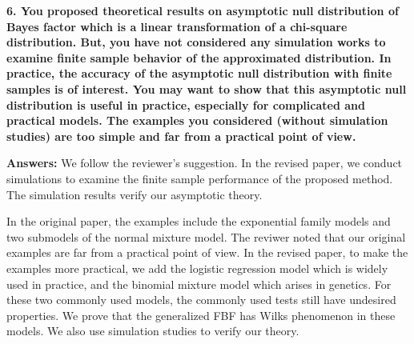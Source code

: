 \documentclass[11pt]{article}
\theoremstyle{plain}
\theoremstyle{definition}
\theoremstyle{remark}
\begin{document}
\textbf{
    6. You proposed theoretical results on asymptotic null distribution of Bayes factor which is a linear transformation of a chi-square distribution.
    But, you have not considered any simulation works to examine finite sample behavior of the approximated distribution.
    In practice, the accuracy of the asymptotic null distribution with finite samples is of interest.
    You may want to show that this asymptotic null distribution is useful in practice, especially for complicated and practical models.
    The examples you considered (without simulation studies) are too simple and far from a practical point of view.
}

\textbf{Answers:}
We follow the reviewer's suggestion.
In the revised paper, we conduct simulations to examine the finite sample performance of the proposed method.
The simulation results verify our asymptotic theory.

In the original paper, the examples include the exponential family models and two submodels of the normal mixture model.
The reviwer noted that our original examples are far from a practical point of view.
In the revised paper, to make the examples more practical, we add the logistic regression model which is widely used in practice, and the binomial mixture model which arises in genetics.
For these two commonly used models, the commonly used tests still have undesired properties.
We prove that the generalized FBF has Wilks phenomenon in these models.
We also use simulation studies to verify our theory.
\end{document}
